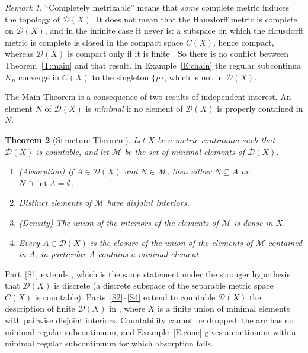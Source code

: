 \documentclass[11pt,reqno]{amsart}
\theoremstyle{plain}
\newtheorem{theorem}{Theorem}[section]
\theoremstyle{definition}
\theoremstyle{remark}
\newtheorem{remark}[theorem]{Remark}
\newcommand{\D}{\mathcal{D}}
\newcommand{\M}{\mathcal{M}}
\newcommand{\intr}{\operatorname{int}}
\begin{document}
\begin{remark}\label{R:complete}
``Completely metrizable'' means that \emph{some} complete metric induces the topology of $\D(X)$. It does not mean that the Hausdorff metric is complete on $\D(X)$, and in the infinite case it never is: a subspace on which the Hausdorff metric is complete is closed in the compact space $C(X)$, hence compact, whereas $\D(X)$ is compact only if it is finite \cite[Corollary~4.13]{Ord18}. So there is no conflict between Theorem~\ref{T:main} and that result. In Example~\ref{E:chain} the regular subcontinua $K_n$ converge in $C(X)$ to the singleton $\{p\}$, which is not in $\D(X)$.
\end{remark}

The Main Theorem is a consequence of two results of independent interest. An element $N$ of $\D(X)$ is \emph{minimal} if no element of $\D(X)$ is properly contained in $N$.

\begin{theorem}[Structure Theorem]\label{T:structure}
Let $X$ be a metric continuum such that $\D(X)$ is countable, and let $\M$ be the set of minimal elements of $\D(X)$.
\begin{enumerate}[label=\textup{(\arabic*)}]
\item\label{S1} \textup{(Absorption)} If $A\in\D(X)$ and $N\in\M$, then either $N\subseteq A$ or $N\cap\intr A=\emptyset$.
\item\label{S2} Distinct elements of $\M$ have disjoint interiors.
\item\label{S3} \textup{(Density)} The union of the interiors of the elements of $\M$ is dense in $X$.
\item\label{S4} Every $A\in\D(X)$ is the closure of the union of the elements of $\M$ contained in $A$; in particular $A$ contains a minimal element.
\end{enumerate}
\end{theorem}

Part~\ref{S1} extends \cite[Proposition~3.15]{CORa}, which is the same statement under the stronger hypothesis that $\D(X)$ is discrete (a discrete subspace of the separable metric space $C(X)$ is countable). Parts~\ref{S2}--\ref{S4} extend to countable $\D(X)$ the description of finite $\D(X)$ in \cite[Theorem~3.16]{CORa}, where $X$ is a finite union of minimal elements with pairwise disjoint interiors. Countability cannot be dropped: the arc has no minimal regular subcontinuum, and Example~\ref{E:cone} gives a continuum with a minimal regular subcontinuum for which absorption fails.
\end{document}
